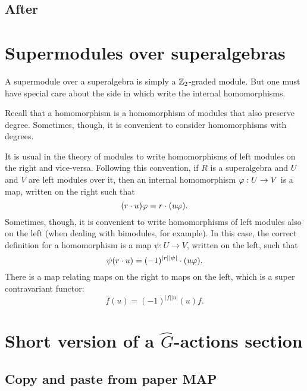 \documentclass{amsbook}
\begin{document}
\section{After}






\chapter{Supermodules over superalgebras}

A supermodule over a superalgebra is simply a $\mathbb{Z}_2$-graded module. But one must have special care about the side in which write the internal homomorphisms.

Recall that a homomorphism is a homomorphism of modules that also preserve degree. Sometimes, though, it is convenient to consider homomorphisms with degrees.

It is usual in the theory of modules to write homomorphisms of left modules on the right and vice-versa. Following this convention, if $R$ is a superalgebra and $U$ and $V$ are left modules over it, then an internal homomorphism $\varphi: U\to V$ is a map, written on the right such that
%
\begin{equation}\label{eq:map-on-the-right}
    (r\cdot u) \varphi = r\cdot (u \varphi).
\end{equation}
%
Sometimes, though, it is convenient to write homomorphisms of left modules also on the left (when dealing with bimodules, for example). In this case, the correct definition for a homomorphism is a map $\psi: U\to V$, written on the left, such that
%
\begin{equation}\label{eq:map-on-the-left}
    \psi (r\cdot u)  = (-1)^{|r||\psi|} \cdot (u \varphi).
\end{equation}
%
%
There is a map relating maps on the right to maps on the left, which is a super contravariant functor:
%
\begin{equation}\label{eq:map-change-side}
    \bar f (u)  = (-1)^{|f||u|} (u)f.
\end{equation}
%

\chapter{Short version of a $\widehat G$-actions section}

\section{Copy and paste from paper MAP}
\end{document}
